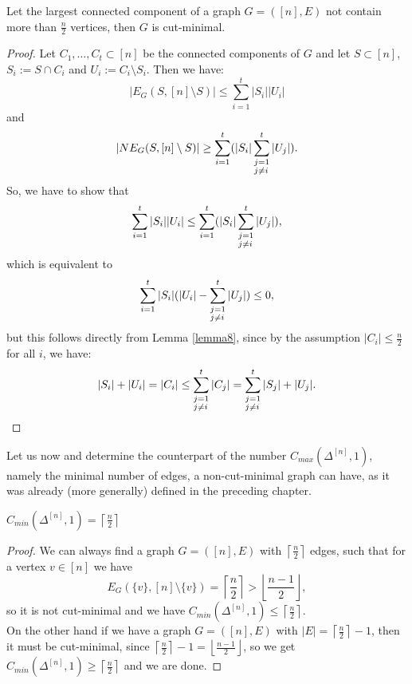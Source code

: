 \begin{prop}
Let the largest connected component of a graph \(G=([n],E)\) not contain more than \(\frac{n}{2}\) vertices, then \(G\) is cut-minimal.
\begin{proof}
Let \(C_1,\ldots,C_t\subset [n]\) be the connected components of \(G\) and let \(S\subset [n]\), \(S_i:=S\cap C_i\) and \(U_i:=C_i\setminus S_i\). Then we have:
\[
|E_G(S,[n]\setminus S)|\leq\sum\limits_{i=1}^t|S_i||U_i|
\] 
and
\[
|NE_G(S,[n]\setminus S)|\geq\sum\limits_{i=1}^t(|S_i|\sum_{\begin{subarray}{l}j=1\\ j\neq i\end{subarray}}^t|U_j|).
\]
So, we have to show that
\[
\sum\limits_{i=1}^t|S_i||U_i|\leq\sum\limits_{i=1}^t(|S_i|\sum_{\begin{subarray}{l}j=1\\ j\neq i\end{subarray}}^t|U_j|),
\]
which is equivalent to
\[
\sum\limits_{i=1}^t|S_i|(|U_i|-\sum_{\begin{subarray}{l}j=1\\ j\neq i\end{subarray}}^t|U_j|)\leq 0,
\]
but this follows directly from Lemma \ref{lemma8}, since by the assumption \(|C_i|\leq\frac{n}{2}\) for all \(i\), we have:
\[
|S_i|+|U_i|=|C_i|\leq\sum_{\begin{subarray}{l}j=1\\ j\neq i\end{subarray}}^t|C_j|=\sum_{\begin{subarray}{l}j=1\\ j\neq i\end{subarray}}^t|S_j|+|U_j|.
\]
\end{proof}
\end{prop}

Let us now and determine the counterpart of the number \(C_{max}(\Delta^{[n]},1)\), namely the minimal number of edges, a non-cut-minimal graph can have, as it was already (more generally) defined in the preceding chapter.

\begin{thm}\label{theorem2}
\(C_{min}(\Delta^{[n]},1)=\left\lceil\frac{n}{2}\right\rceil\)
\begin{proof}
We can always find a graph \(G=([n],E)\) with \(\left\lceil\frac{n}{2}\right\rceil\) edges, such that for a vertex \(v\in [n]\) we have
\[
E_G(\{v\},[n]\setminus\{v\})=\left\lceil\frac{n}{2}\right\rceil>\left\lfloor\frac{n-1}{2}\right\rfloor,
\]
so it is not cut-minimal and we have \(C_{min}(\Delta^{[n]},1)\leq\left\lceil\frac{n}{2}\right\rceil\).\\
On the other hand if we have a graph \(G=([n],E)\) with \(|E|=\left\lceil\frac{n}{2}\right\rceil-1\), then it must be cut-minimal, since \(\left\lceil\frac{n}{2}\right\rceil-1=\left\lfloor\frac{n-1}{2}\right\rfloor\), so we get \(C_{min}(\Delta^{[n]},1)\geq\left\lceil\frac{n}{2}\right\rceil\) and we are done.
\end{proof}
\end{thm}

